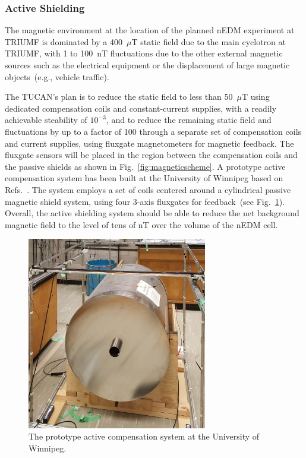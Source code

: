 \subsubsection{Active Shielding}

The magnetic environment at the location of the planned nEDM
experiment at TRIUMF is dominated by a 400~$\mu$T static field due to
the main cyclotron at TRIUMF, with 1 to 100~nT fluctuations due to the
other external magnetic sources such as the electrical equipment or
the displacement of large magnetic objects~(e.g., vehicle traffic).

The TUCAN's plan is to reduce the static field to less than 50~$\mu$T
using dedicated compensation coils and constant-current supplies, with
a readily achievable steability of $10^{-3}$, and to reduce the
remaining static field and fluctuations by up to a factor of 100
through a separate set of compensation coils and current supplies,
using fluxgate magnetometers for magnetic feedback. The fluxgate
sensors will be placed in the region between the compensation coils
and the passive shields as shown in Fig.~\ref{fig:magneticscheme}.  A
prototype active compensation system has been built at the University
of Winnipeg based on Refs.~\cite{beatrice,afach2014dynamic}. The
system employs a set of coils centered around a cylindrical passive
magnetic shield system, using four 3-axis fluxgates for feedback~(see
Fig.~\ref{fig:prototype_active}). Overall, the active shielding system
should be able to reduce the net background magnetic field to the
level of tens of nT over the volume of the nEDM cell.


\begin{figure}[h!]
  \centering
  \includegraphics[width=0.7\textwidth]{active_prototype.jpg}
  \caption{The prototype active compensation system at the University
    of Winnipeg.}
  \label{fig:prototype_active}
\end{figure}


